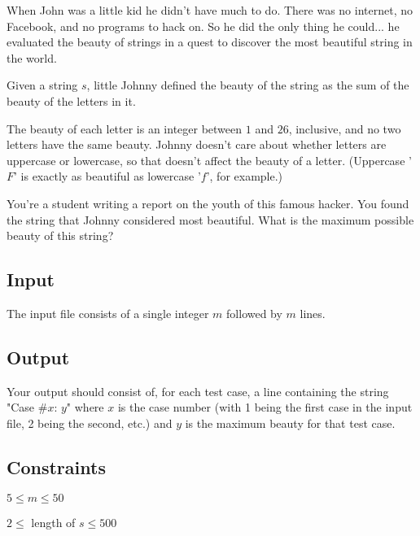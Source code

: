 When John was a little kid he didn't have much to do. There was no internet, no
Facebook, and no programs to hack on. So he did the only thing he could... he
evaluated the beauty of strings in a quest to discover the most beautiful
string in the world.

Given a string $s$, little Johnny defined the beauty of the string as the sum
of the beauty of the letters in it.

The beauty of each letter is an integer between $1$ and $26$, inclusive, and no two
letters have the same beauty. Johnny doesn't care about whether letters are
uppercase or lowercase, so that doesn't affect the beauty of a letter.
(Uppercase '$F$' is exactly as beautiful as lowercase '$f$', for example.)

You're a student writing a report on the youth of this famous hacker. You found
the string that Johnny considered most beautiful. What is the maximum possible
beauty of this string?

\subsection*{Input}

The input file consists of a single integer $m$ followed by $m$ lines.

\subsection*{Output}

Your output should consist of, for each test case, a line containing the string
"Case \#$x$: $y$" where $x$ is the case number (with 1 being the first case in
    the input file, 2 being the second, etc.) and $y$ is the maximum beauty for
that test case.

\subsection*{Constraints}
$5 \leq m \leq 50$

$2 \leq$ length of $s \leq 500$

